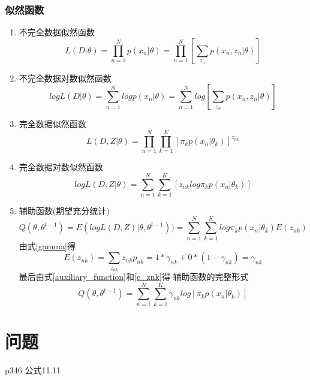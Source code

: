\subsubsection{似然函数}
\begin{enumerate}
\item 不完全数据似然函数
\begin{equation}
L(D|\theta) = \prod_{n=1}^Np(x_n|\theta)
= \prod_{n=1}^N[\sum_{z_n}p(x_n, z_n|\theta)] 
\end{equation}
\item 不完全数据对数似然函数
\begin{equation}
logL(D|\theta) = \sum_{n=1}^Nlogp(x_n|\theta)
= \sum_{n=1}^Nlog[\sum_{z_n}p(x_n, z_n|\theta)] 
\end{equation}

\item 完全数据似然函数
\begin{equation}
L(D, Z|\theta) = \prod_{n=1}^N\prod_{k=1}^K[\pi_kp(x_n|\theta_k)]^{z_{nk}}
\end{equation}

\item 完全数据对数似然函数
\begin{equation}
logL(D, Z|\theta) = \sum_{n=1}^N\sum_{k=1}^K[z_{nk}log\pi_kp(x_n|\theta_k)
] 
\end{equation}

\item 辅助函数(期望充分统计)
\begin{equation}
Q(\theta, \theta^{t-1}) = E(logL(D,Z)|\theta, \theta^{t-1}))
= \sum_{n=1}^N\sum_{k=1}^Klog\pi_kp(x_n|\theta_k)E(z_{nk})
\label{auxiliary_function}
\end{equation}
由式\ref{gamma}得
\begin{equation}
E(z_{nk}) = \sum_{z_{nk}}z_{nk}p_{nk}
 = 1 * \gamma_{nk} + 0 * (1 - \gamma_{nk}) = \gamma_{nk}
\label{e_znk}
\end{equation}
最后由式\ref{auxiliary_function}和\ref{e_znk}得
辅助函数的完整形式
\begin{equation}
Q(\theta, \theta^{t-1}) =
\sum_{n=1}^N\sum_{k=1}^K\gamma_{nk}log[\pi_kp(x_n|\theta_k)]
\end{equation}
\end{enumerate}

\section{问题}
p346 公式11.11

